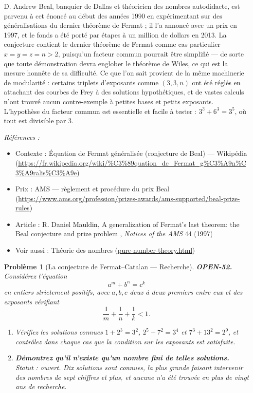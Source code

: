 \documentclass[11pt]{article}
\newtheorem{problem}{Problème}
\newenvironment{refs}{\par\small\noindent\emph{Références :}\begin{itemize}\setlength\itemsep{0pt}}{\end{itemize}\normalsize}
\begin{document}
\noindent D. Andrew Beal, banquier de Dallas et théoricien des nombres autodidacte,
est parvenu à cet énoncé au début des années 1990 en expérimentant sur des généralisations
du dernier théorème de Fermat ; il l'a annoncé avec un prix en 1997, et le fonds a été porté
par étapes à un million de dollars en 2013. La conjecture contient le dernier théorème de
Fermat comme cas particulier $ x = y = z = n > 2 $, puisqu'un facteur commun pourrait
être simplifié --- de sorte que toute démonstration devra englober le théorème de Wiles, ce
qui est la mesure honnête de sa difficulté. Ce que l'on sait provient de la même machinerie
de modularité : certains triplets d'exposants comme $ (3,3,n) $ ont été réglés en
attachant des courbes de Frey à des solutions hypothétiques, et de vastes calculs n'ont
trouvé aucun contre-exemple à petites bases et petits exposants. L'hypothèse du facteur
commun est essentielle et facile à tester : $ 3^{3} + 6^{3} = 3^{5} $, où tout est
divisible par $ 3 $.

\begin{refs}
\item Contexte : Équation de Fermat généralisée (conjecture de Beal) --- Wikipédia (\url{https://fr.wikipedia.org/wiki/%C3%89quation_de_Fermat_g%C3%A9n%C3%A9ralis%C3%A9e})
\item Prix : AMS --- règlement et procédure du prix Beal (\url{https://www.ams.org/profession/prizes-awards/ams-supported/beal-prize-rules})
\item Article : R. Daniel Mauldin, \og{} A generalization of Fermat's last theorem: the Beal conjecture and prize problem \fg{}, \textit{Notices of the AMS} 44 (1997)
\item Voir aussi : Théorie des nombres (\url{pure-number-theory.html})
\end{refs}

\bigskip

\begin{problem}[{La conjecture de Fermat--Catalan --- Recherche}]
\textbf{OPEN-52.} Considérez l'équation
\[ a^{m} + b^{n} = c^{k} \]
en entiers strictement positifs, avec $ a, b, c $ deux à deux premiers entre eux et des
exposants vérifiant
\[ \frac{1}{m} + \frac{1}{n} + \frac{1}{k} < 1 . \]
\begin{enumerate}
\item[(a)] Vérifiez les solutions connues $ 1 + 2^{3} = 3^{2} $, $ 2^{5} + 7^{2} = 3^{4} $ et
$ 7^{3} + 13^{2} = 2^{9} $, et contrôlez dans chaque cas que la condition sur les
exposants est satisfaite.
\item[(b)] \textbf{Démontrez qu'il n'existe qu'un nombre fini de telles solutions.} Statut :
ouvert. Dix solutions sont connues, la plus grande faisant intervenir des nombres de sept
chiffres et plus, et aucune n'a été trouvée en plus de vingt ans de recherche.
\end{enumerate}

\end{problem}
\end{document}
